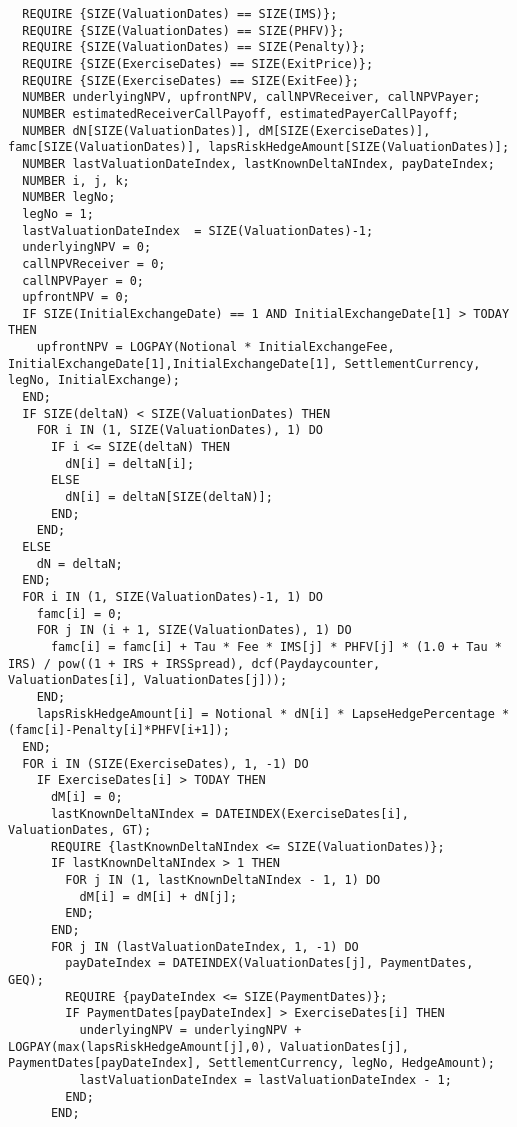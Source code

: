 \begin{listing}[hbt] 
\begin{verbatim} 
  REQUIRE {SIZE(ValuationDates) == SIZE(IMS)};
  REQUIRE {SIZE(ValuationDates) == SIZE(PHFV)};
  REQUIRE {SIZE(ValuationDates) == SIZE(Penalty)};
  REQUIRE {SIZE(ExerciseDates) == SIZE(ExitPrice)};
  REQUIRE {SIZE(ExerciseDates) == SIZE(ExitFee)};
  NUMBER underlyingNPV, upfrontNPV, callNPVReceiver, callNPVPayer;
  NUMBER estimatedReceiverCallPayoff, estimatedPayerCallPayoff;
  NUMBER dN[SIZE(ValuationDates)], dM[SIZE(ExerciseDates)], famc[SIZE(ValuationDates)], lapsRiskHedgeAmount[SIZE(ValuationDates)];
  NUMBER lastValuationDateIndex, lastKnownDeltaNIndex, payDateIndex;
  NUMBER i, j, k;
  NUMBER legNo;
  legNo = 1;
  lastValuationDateIndex  = SIZE(ValuationDates)-1;
  underlyingNPV = 0;
  callNPVReceiver = 0;
  callNPVPayer = 0;
  upfrontNPV = 0;
  IF SIZE(InitialExchangeDate) == 1 AND InitialExchangeDate[1] > TODAY THEN
    upfrontNPV = LOGPAY(Notional * InitialExchangeFee, InitialExchangeDate[1],InitialExchangeDate[1], SettlementCurrency, legNo, InitialExchange);
  END;
  IF SIZE(deltaN) < SIZE(ValuationDates) THEN
    FOR i IN (1, SIZE(ValuationDates), 1) DO
      IF i <= SIZE(deltaN) THEN
        dN[i] = deltaN[i];
      ELSE
        dN[i] = deltaN[SIZE(deltaN)];
      END;
    END;
  ELSE
    dN = deltaN;
  END;
  FOR i IN (1, SIZE(ValuationDates)-1, 1) DO
    famc[i] = 0;
    FOR j IN (i + 1, SIZE(ValuationDates), 1) DO
      famc[i] = famc[i] + Tau * Fee * IMS[j] * PHFV[j] * (1.0 + Tau * IRS) / pow((1 + IRS + IRSSpread), dcf(Paydaycounter, ValuationDates[i], ValuationDates[j]));
    END;
    lapsRiskHedgeAmount[i] = Notional * dN[i] * LapseHedgePercentage * (famc[i]-Penalty[i]*PHFV[i+1]);
  END;
  FOR i IN (SIZE(ExerciseDates), 1, -1) DO
    IF ExerciseDates[i] > TODAY THEN
      dM[i] = 0;
      lastKnownDeltaNIndex = DATEINDEX(ExerciseDates[i], ValuationDates, GT);
      REQUIRE {lastKnownDeltaNIndex <= SIZE(ValuationDates)};
      IF lastKnownDeltaNIndex > 1 THEN
        FOR j IN (1, lastKnownDeltaNIndex - 1, 1) DO
          dM[i] = dM[i] + dN[j];
        END;
      END;
      FOR j IN (lastValuationDateIndex, 1, -1) DO
        payDateIndex = DATEINDEX(ValuationDates[j], PaymentDates, GEQ);
        REQUIRE {payDateIndex <= SIZE(PaymentDates)};
        IF PaymentDates[payDateIndex] > ExerciseDates[i] THEN
          underlyingNPV = underlyingNPV + LOGPAY(max(lapsRiskHedgeAmount[j],0), ValuationDates[j], PaymentDates[payDateIndex], SettlementCurrency, legNo, HedgeAmount);
          lastValuationDateIndex = lastValuationDateIndex - 1; 
        END;
      END;
      

\end{verbatim}
\end{listing}
